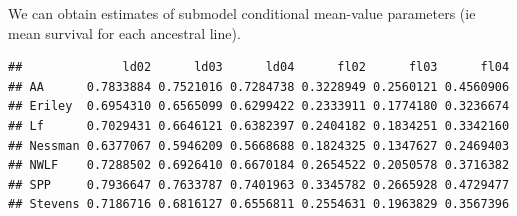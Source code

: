 \documentclass[
  ignorenonframetext,
]{beamer}
\newenvironment{Shaded}{\begin{snugshade}}{\end{snugshade}}
\newcommand{\AttributeTok}[1]{\textcolor[rgb]{0.77,0.63,0.00}{#1}}
\newcommand{\ConstantTok}[1]{\textcolor[rgb]{0.00,0.00,0.00}{#1}}
\newcommand{\DecValTok}[1]{\textcolor[rgb]{0.00,0.00,0.81}{#1}}
\newcommand{\FunctionTok}[1]{\textcolor[rgb]{0.00,0.00,0.00}{#1}}
\newcommand{\NormalTok}[1]{#1}
\newcommand{\OtherTok}[1]{\textcolor[rgb]{0.56,0.35,0.01}{#1}}
\newcommand{\SpecialCharTok}[1]{\textcolor[rgb]{0.00,0.00,0.00}{#1}}
\newcommand{\StringTok}[1]{\textcolor[rgb]{0.31,0.60,0.02}{#1}}
\begin{document}
\begin{frame}[fragile]{}
\protect\hypertarget{section-41}{}
We can obtain estimates of submodel conditional mean-value parameters
(ie mean survival for each ancestral line).

\vspace{12pt}
\tiny

\begin{Shaded}
\end{Shaded}

\begin{verbatim}
##              ld02      ld03      ld04      fl02      fl03      fl04
## AA      0.7833884 0.7521016 0.7284738 0.3228949 0.2560121 0.4560906
## Eriley  0.6954310 0.6565099 0.6299422 0.2333911 0.1774180 0.3236674
## Lf      0.7029431 0.6646121 0.6382397 0.2404182 0.1834251 0.3342160
## Nessman 0.6377067 0.5946209 0.5668688 0.1824325 0.1347627 0.2469403
## NWLF    0.7288502 0.6926410 0.6670184 0.2654522 0.2050578 0.3716382
## SPP     0.7936647 0.7633787 0.7401963 0.3345782 0.2665928 0.4729477
## Stevens 0.7186716 0.6816127 0.6556811 0.2554631 0.1963829 0.3567396
\end{verbatim}
\end{frame}
\end{document}
